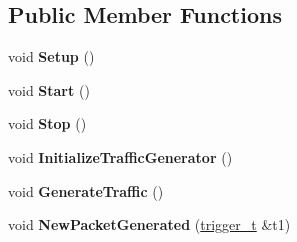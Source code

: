 \subsection*{Public Member Functions}
\begin{DoxyCompactItemize}
\item 
\mbox{\label{classcompcxx__TrafficGenerator__24_a081cdf61104a974b57fc7462b0f8b963}} 
void {\bfseries Setup} ()
\item 
\mbox{\label{classcompcxx__TrafficGenerator__24_a64cc17c1a93e7653c8c9f08fee429887}} 
void {\bfseries Start} ()
\item 
\mbox{\label{classcompcxx__TrafficGenerator__24_a257cf2a2bcc7513ade96e6c2da90a42d}} 
void {\bfseries Stop} ()
\item 
\mbox{\label{classcompcxx__TrafficGenerator__24_a693ec479221268ae6a92c7eb6aabecde}} 
void {\bfseries Initialize\+Traffic\+Generator} ()
\item 
\mbox{\label{classcompcxx__TrafficGenerator__24_a7efdb90364f59d85242d6392427a57f5}} 
void {\bfseries Generate\+Traffic} ()
\item 
\mbox{\label{classcompcxx__TrafficGenerator__24_a374bc95b0045fe2e76196e23ad0ff2f5}} 
void {\bfseries New\+Packet\+Generated} (\hyperlink{classtrigger__t}{trigger\+\_\+t} \&t1)
\end{DoxyCompactItemize}
